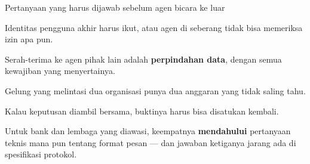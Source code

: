 \documentclass[aspectratio=169,11pt,t]{beamer}
\begin{document}
\begin{frame}[shrink=25]{Pertanyaan yang harus dijawab sebelum agen bicara ke luar}
\begin{minipage}[t]{0.494\textwidth}
\begin{icardaccent}
Identitas pengguna akhir harus ikut, atau agen di seberang tidak bisa memeriksa izin apa pun.
\end{icardaccent}
\end{minipage}%
\hfill
\begin{minipage}[t]{0.494\textwidth}
\begin{icardaccent}
Serah-terima ke agen pihak lain adalah \textbf{perpindahan data}, dengan semua kewajiban yang menyertainya.
\end{icardaccent}
\end{minipage}%


\vskip 4pt

\begin{minipage}[t]{0.494\textwidth}
\begin{icard}
Gelung yang melintasi dua organisasi punya dua anggaran yang tidak saling tahu.
\end{icard}
\end{minipage}%
\hfill
\begin{minipage}[t]{0.494\textwidth}
\begin{icard}
Kalau keputusan diambil bersama, buktinya harus bisa disatukan kembali.
\end{icard}
\end{minipage}%
{\fontsize{9.4}{12.6}\selectfont\color{fg2}Untuk bank dan lembaga yang diawasi, keempatnya \textbf{mendahului} pertanyaan teknis mana pun tentang format pesan --- dan jawaban ketiganya jarang ada di spesifikasi protokol.\par}\vskip 4pt
\end{frame}
\end{document}
